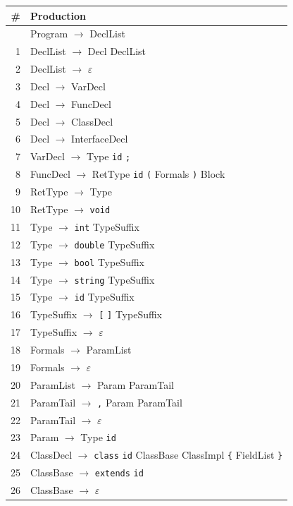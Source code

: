 \documentclass[12pt,a4paper]{article}
\begin{document}
\begin{longtable}{rp{11cm}}
\toprule
\textbf{\#} & \textbf{Production} \\
\midrule
\endhead
\bottomrule
\endfoot
0  & Program $\rightarrow$ DeclList \\
1  & DeclList $\rightarrow$ Decl DeclList \\
2  & DeclList $\rightarrow$ $\varepsilon$ \\
3  & Decl $\rightarrow$ VarDecl \\
4  & Decl $\rightarrow$ FuncDecl \\
5  & Decl $\rightarrow$ ClassDecl \\
6  & Decl $\rightarrow$ InterfaceDecl \\
7  & VarDecl $\rightarrow$ Type \texttt{id} \texttt{;} \\
8  & FuncDecl $\rightarrow$ RetType \texttt{id} \texttt{(} Formals \texttt{)} Block \\
9  & RetType $\rightarrow$ Type \\
10 & RetType $\rightarrow$ \texttt{void} \\
11 & Type $\rightarrow$ \texttt{int} TypeSuffix \\
12 & Type $\rightarrow$ \texttt{double} TypeSuffix \\
13 & Type $\rightarrow$ \texttt{bool} TypeSuffix \\
14 & Type $\rightarrow$ \texttt{string} TypeSuffix \\
15 & Type $\rightarrow$ \texttt{id} TypeSuffix \\
16 & TypeSuffix $\rightarrow$ \texttt{[} \texttt{]} TypeSuffix \\
17 & TypeSuffix $\rightarrow$ $\varepsilon$ \\
18 & Formals $\rightarrow$ ParamList \\
19 & Formals $\rightarrow$ $\varepsilon$ \\
20 & ParamList $\rightarrow$ Param ParamTail \\
21 & ParamTail $\rightarrow$ \texttt{,} Param ParamTail \\
22 & ParamTail $\rightarrow$ $\varepsilon$ \\
23 & Param $\rightarrow$ Type \texttt{id} \\
24 & ClassDecl $\rightarrow$ \texttt{class} \texttt{id} ClassBase ClassImpl \texttt{\{} FieldList \texttt{\}} \\
25 & ClassBase $\rightarrow$ \texttt{extends} \texttt{id} \\
26 & ClassBase $\rightarrow$ $\varepsilon$ \\

\end{longtable}
\end{document}
